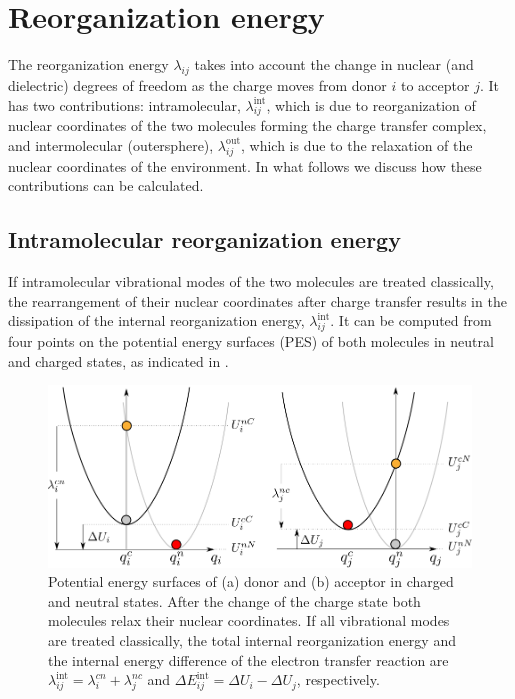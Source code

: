 \section{Reorganization energy}
\label{sec:reorganization}

The reorganization energy $\lambda_{ij}$ takes into account the change in  nuclear (and dielectric) degrees of freedom as the charge moves from donor $i$ to acceptor $j$. It has two contributions: intramolecular, $\lambda^\text{int}_{ij}$, which is due to reorganization of nuclear coordinates of the two molecules forming the charge transfer complex, and intermolecular (outersphere), $\lambda^\text{out}_{ij}$, which is due to the relaxation of the nuclear coordinates of the environment. In what follows we discuss how these contributions can be calculated.

\subsection{Intramolecular reorganization energy}
\label{sec:eintramolecular}
If intramolecular vibrational modes of the two molecules are treated classically, the rearrangement of their nuclear coordinates after charge transfer results in the dissipation of the internal reorganization energy, $\lambda_{ij}^\text{int}$. It can be computed from four points on the potential energy surfaces (PES) of both molecules in neutral and charged states, as indicated in . 

\begin{figure}
   \centering
   \includegraphics[width=0.6\linewidth]{fig/monomer_parabolas}
    \caption{Potential energy surfaces of (a) donor and (b) acceptor in charged and neutral states. After the change of the charge state both molecules relax their nuclear coordinates. If all vibrational modes are treated classically, the total internal reorganization energy and the internal energy difference of the electron transfer reaction are $\lambda_{ij}^\text{int} = \lambda_{i}^{cn} + \lambda_{j}^{nc}$ and $\Delta E_{ij}^\text{int} =  \Delta U_i - \Delta U_j$, respectively.}
   \label{fig:parabolas}
\end{figure}


